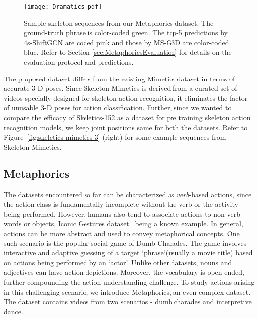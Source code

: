\documentclass[twocolumn]{svjour3}          \smartqed  \usepackage{graphicx}
\begin{document}
\begin{figure*}[!ht]
    \centering
    \texttt{[image: Dramatics.pdf]}
    \caption{Sample skeleton sequences from our Metaphorics dataset. The ground-truth phrase is color-coded green. The top-5 predictions by 4s-ShiftGCN are coded pink and those by MS-G3D are color-coded blue. Refer to Section \ref{sec:MetaphoricsEvaluation} for details on the evaluation protocol and predictions.}
    \label{fig:metaphorics-results}
\end{figure*}

The proposed dataset differs from the existing Mimetics dataset in terms of accurate 3-D poses. Since Skeleton-Mimetics is derived from a curated set of videos specially designed for skeleton action recognition, it eliminates the factor of unusable 3-D poses for action classification. Further, since we wanted to compare the efficacy of Skeletics-152 as a dataset for pre training skeleton action recognition models, we keep joint positions same for both the datasets. 
Refer to Figure~\ref{fig:skeletics-mimetics-3} (right) for some example sequences from Skeleton-Mimetics.

\subsection{Metaphorics}
\label{sec:Metaphoricsintro}

The datasets encountered so far can be characterized as \textit{verb}-based actions, since the action class is fundamentally incomplete without the verb or the activity being performed. However, humans also tend to associate actions to non-verb words or objects, Iconic Gestures dataset~\cite{3DICONIC} being a known example. In general, actions can be more abstract and used to convey metaphorical concepts. One such scenario is the popular social game of Dumb Charades. The game involves interactive and adaptive guessing of a target `phrase`(usually a movie title) based on actions being performed by an `actor'. Unlike other datasets, nouns and adjectives can have action depictions. Moreover, the vocabulary is open-ended, further compounding the action understanding challenge. To study actions arising in this challenging scenario, we introduce Metaphorics, an even complex dataset. The dataset contains videos from two scenarios - dumb charades and interpretive dance.
\end{document}
